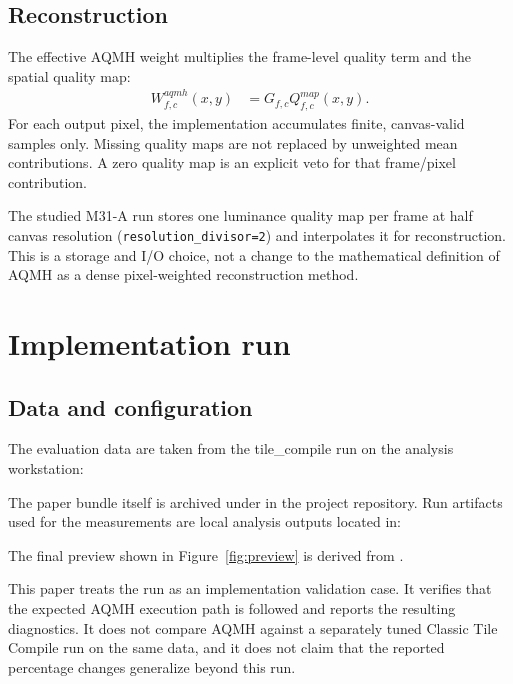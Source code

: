 \documentclass[10pt,twocolumn]{article}
\begin{document}
\subsection{Reconstruction}

The effective AQMH weight multiplies the frame-level quality term and the spatial quality map:
\begin{equation}
  \begin{split}
  W_{f,c}^{aqmh}(x,y) &=
  G_{f,c}Q_{f,c}^{map}(x,y).
  \end{split}
\end{equation}
For each output pixel, the implementation accumulates finite, canvas-valid samples only. Missing
quality maps are not replaced by unweighted mean contributions. A zero quality map is an
explicit veto for that frame/pixel contribution.

The studied M31-A run stores one luminance quality map per frame at half canvas resolution
(\texttt{resolution\_divisor=2}) and interpolates it for reconstruction. This is a storage and I/O
choice, not a change to the mathematical definition of AQMH as a dense pixel-weighted
reconstruction method.

\section{Implementation run}

\subsection{Data and configuration}

The evaluation data are taken from the tile\_compile run on the analysis workstation:
\begin{center}
\small
{}
\end{center}
The paper bundle itself is archived under
\href{https://github.com/jeamy/tile_compile/tree/master/docs/AQMH/zenodo-0.1.0}
{} in the project repository. Run artifacts used for
the measurements are local analysis outputs located in:
\begin{center}
\small
{}
\end{center}
The final preview shown in Figure~\ref{fig:preview} is derived from
.

This paper treats the run as an implementation validation case. It verifies that the expected AQMH
execution path is followed and reports the resulting diagnostics. It does not compare AQMH against
a separately tuned Classic Tile Compile run on the same data, and it does not claim that the
reported percentage changes generalize beyond this run.
\end{document}
